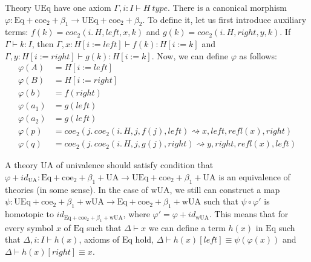 \documentclass[reqno]{amsart}
\theoremstyle{definition}
\theoremstyle{remark}
\newcommand{\deq}{\equiv}
\newcommand{\repl}{:=}
\newcommand{\idtype}{\rightsquigarrow}
\newcommand{\wUA}{\mathrm{wUA}}
\newcommand{\UA}{\mathrm{UA}}
\newcommand{\coe}{\mathrm{coe}}
\newcommand{\Eq}{\mathrm{Eq}}
\newcommand{\UEq}{\mathrm{UEq}}
\newcommand{\type}{type}
\numberwithin{figure}{section}
\begin{document}
Theory $\UEq$ have one axiom $\Gamma, i : I \vdash H\ \type$.
There is a canonical morphism $\varphi : \Eq + \coe_2 + \beta_1 \to \UEq + \coe_2 + \beta_2$.
To define it, let us first introduce auxiliary terms: $f(k) = coe_2(i.\,H, left, x, k)$ and $g(k) = coe_2(i.\,H, right, y, k)$.
If $\Gamma \vdash k : I$, then $\Gamma, x : H[i \repl left] \vdash f(k) : H[i \repl k]$ and $\Gamma, y : H[i \repl right] \vdash g(k) : H[i \repl k]$.
Now, we can define $\varphi$ as follows:
\begin{align*}
\varphi(A) & = H[i \repl left] \\
\varphi(B) & = H[i \repl right] \\
\varphi(b) & = f(right) \\
\varphi(a_1) & = g(left) \\
\varphi(a_2) & = g(left) \\
\varphi(p) & = coe_2(j.\,coe_2(i.\,H, j, f(j), left) \idtype x, left, refl(x), right) \\
\varphi(q) & = coe_2(j.\,coe_2(i.\,H, j, g(j), right) \idtype y, right, refl(x), left)
\end{align*}

A theory $\UA$ of univalence should satisfy condition that $\varphi + id_{\UA} : \Eq + \coe_2 + \beta_1 + \UA \to \UEq + \coe_2 + \beta_1 + \UA$ is an equivalence of theories (in some sense).
In the case of $\wUA$, we still can construct a map $\psi : \UEq + \coe_2 + \beta_1 + \wUA \to \Eq + \coe_2 + \beta_1 + \wUA$ such that $\psi \circ \varphi'$ is homotopic to $id_{\Eq + \coe_2 + \beta_1 + \wUA}$, where $\varphi' = \varphi + id_{\wUA}$.
This means that for every symbol $x$ of $\Eq$ such that $\Delta \vdash x$ we can define a term $h(x)$ in $\Eq$ such that
$\Delta, i : I \vdash h(x)$, axioms of $\Eq$ hold, $\Delta \vdash h(x)[left] \deq \psi(\varphi(x))$ and $\Delta \vdash h(x)[right] \deq x$.
\end{document}
